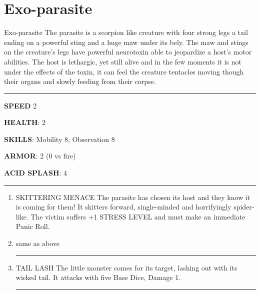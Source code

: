 \section{Exo-parasite}

\begin{rpg-commentbox}{Exo-parasite}
    The parasite is a scorpion like creature with four strong legs a tail ending on a powerful sting and a huge maw under its bely. The maw and stings on the creature's legs have powerful neurotoxin able to jeopardize a host's motor abilities. The host is lethargic, yet still alive and in the few moments it is not under the effects of the toxin, it can feel the creature tentacles moving though their organs and slowly feeding from their corpse. 
\end{rpg-commentbox}    


\begin{rpg-commentbox}{}


    \par\noindent\rule{\textwidth}{0.4pt}

    \textbf{SPEED} 2

    \textbf{HEALTH}: 2

    \textbf{SKILLS}: Mobility 8, Observation 8
    
    \textbf{ARMOR}: 2 (0 vs fire)
    
    \textbf{ACID SPLASH}: 4

    \par\noindent\rule{\textwidth}{0.4pt}

    \begin{small}
    \begin{enumerate}
        \item SKITTERING MENACE The parasite has chosen its host and they know it is coming for
        them! It skitters forward, single-minded and horrifyingly spider-like. The victim suffers +1
        STRESS LEVEL and must make an immediate Panic Roll.
        \item same as above
        
        \par\noindent\rule{.9\textwidth}{0.4pt}

        \item TAIL LASH The little monster comes for its target, lashing out with its wicked tail. It attacks
        with five Base Dice, Damage 1.

        \par\noindent\rule{.9\textwidth}{0.4pt}


\end{enumerate}
\end{small}
\end{rpg-commentbox}
